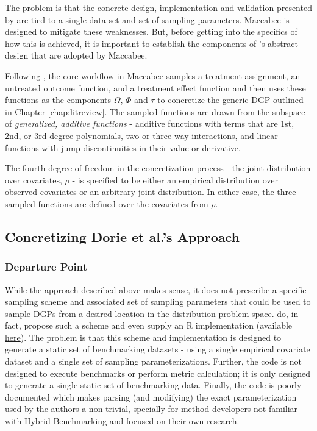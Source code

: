 \documentclass[../main.tex]{subfiles}
\begin{document}
The problem is that the concrete design, implementation and validation presented by \textcite{Dorie2019Automated1} are tied to a single data set and set of sampling parameters. Maccabee is designed to mitigate these weaknesses. But, before getting into the specifics of how this is achieved, it is important to establish the components of \textcite{Dorie2019Automated1}'s abstract design that are adopted by Maccabee.

Following \textcite{Dorie2019Automated1}, the core workflow in Maccabee samples a treatment assignment, an untreated outcome function, and a treatment effect function and then uses these functions as the components $\Omega$, $\Phi$ and $\tau$ to concretize the generic DGP outlined in Chapter \ref{chap:litreview}. The sampled functions are drawn from the subspace of \textit{generalized, additive functions} - additive functions with terms that are 1st, 2nd, or 3rd-degree polynomials, two or three-way interactions, and linear functions with jump discontinuities in their value or derivative.

\vspace{\baselineskip}

The fourth degree of freedom in the concretization process - the joint distribution over covariates, $\rho$ - is specified to be either an empirical distribution over observed covariates or an arbitrary joint distribution. In either case, the three sampled functions are defined over the covariates from $\rho$.

\subsection{Concretizing Dorie et al.'s Approach}

\subsubsection{Departure Point}

While the approach described above makes sense, it does not prescribe a specific sampling scheme and associated set of sampling parameters that could be used to sample DGPs from a desired location in the distribution problem space. \textcite{Dorie2019Automated1} do, in fact, propose such a scheme and even supply an R implementation (available \href{https://github.com/vdorie/aciccomp}{here}). The problem is that this scheme and implementation is designed to generate a static set of benchmarking datasets - using a single empirical covariate dataset and a single set of sampling parameterizations. Further, the code is not designed to execute benchmarks or perform metric calculation; it is only designed to generate a single static set of benchmarking data. Finally, the code is poorly documented which makes parsing (and modifying) the exact parameterization used by the authors a non-trivial, specially for method developers not familiar with Hybrid Benchmarking and focused on their own research.
\end{document}
